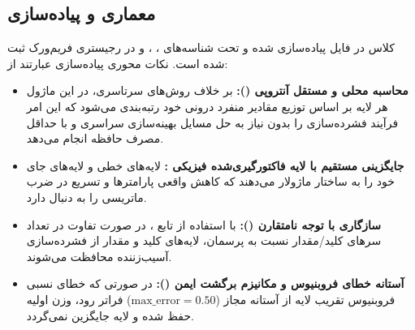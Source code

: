 \subsection{معماری و پیاده‌سازی}
کلاس  در فایل  پیاده‌سازی شده و تحت شناسه‌های ، ،  و  در رجیستری فریم‌ورک ثبت شده است. نکات محوری پیاده‌سازی عبارتند از:
\begin{itemize}
    \item \textbf{محاسبه محلی و مستقل آنتروپی ():} بر خلاف روش‌های سرتاسری، در این ماژول هر لایه بر اساس توزیع مقادیر منفرد درونی خود رتبه‌بندی می‌شود که این امر فرآیند فشرده‌سازی را بدون نیاز به حل مسایل بهینه‌سازی سراسری و با حداقل مصرف حافظه انجام می‌دهد.
    \item \textbf{جایگزینی مستقیم با لایه فاکتورگیری‌شده فیزیکی :} لایه‌های خطی و لایه‌های  جای خود را به ساختار ماژولار  می‌دهند که کاهش واقعی پارامترها و تسریع در ضرب ماتریسی را به دنبال دارد.
    \item \textbf{سازگاری با توجه نامتقارن ():} با استفاده از تابع ، در صورت تفاوت در تعداد سرهای کلید/مقدار نسبت به پرسمان، لایه‌های کلید و مقدار از فشرده‌سازی آسیب‌زننده محافظت می‌شوند.
    \item \textbf{آستانه خطای فروبنیوس و مکانیزم برگشت ایمن ():} در صورتی که خطای نسبی فروبنیوس تقریب لایه از آستانه مجاز ($\text{max\_error}=0.50$) فراتر رود، وزن اولیه حفظ شده و لایه جایگزین نمی‌گردد.
\end{itemize}
